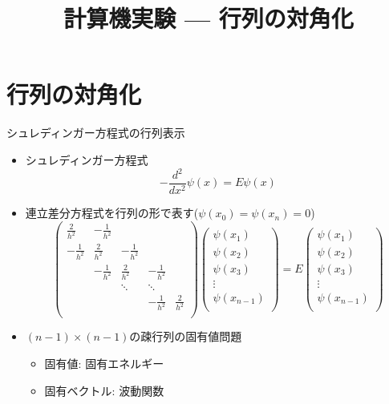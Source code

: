 \documentclass[dvipdfmx]{beamer}
\title{計算機実験 --- 行列の対角化}
\begin{document}

\begin{frame}
  \titlepage
  \tableofcontents
\end{frame}

\section{行列の対角化}

\begin{frame}[t,fragile]{シュレディンガー方程式の行列表示}
  \begin{itemize}
  \item シュレディンガー方程式
    \[
    -\frac{d^2}{dx^2}\psi(x) = E \psi(x)
    \]
  \item 連立差分方程式を行列の形で表す($\psi(x_0)=\psi(x_n)=0$)
    \[
    \begin{pmatrix}
      \frac{2}{h^2} & -\frac{1}{h^2} \\
      -\frac{1}{h^2} & \frac{2}{h^2} & -\frac{1}{h^2} \\
      & -\frac{1}{h^2} & \frac{2}{h^2} & -\frac{1}{h^2} \\
      & & \ddots & \ddots \\
      & & & -\frac{1}{h^2} & \frac{2}{h^2} \\
    \end{pmatrix}
    \begin{pmatrix}
      \psi(x_1) \\
      \psi(x_2) \\
      \psi(x_3) \\
      \vdots \\
      \psi(x_{n-1}) \\
    \end{pmatrix}
    = E
    \begin{pmatrix}
      \psi(x_1) \\
      \psi(x_2) \\
      \psi(x_3) \\
      \vdots \\
      \psi(x_{n-1}) \\
    \end{pmatrix}
    \]
  \item $(n-1) \times (n-1)$の疎行列の固有値問題
    \begin{itemize}
    \item 固有値: 固有エネルギー
    \item 固有ベクトル: 波動関数
    \end{itemize}
  \end{itemize}
\end{frame}
\end{document}
